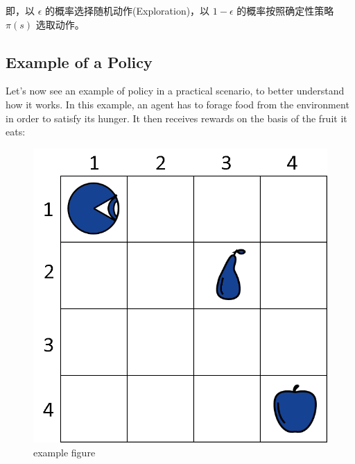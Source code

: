 即，以 $\epsilon$ 的概率选择随机动作(Exploration)，以 $1 - \epsilon$ 
的概率按照确定性策略 $\pi(s)$ 选取动作。


\subsection{Example of a Policy}

Let's now see an example of policy in a practical scenario, 
to better understand how it works. In this example, an agent 
has to forage food from the environment in order to satisfy 
its hunger. It then receives rewards on the basis of the 
fruit it eats:

\begin{figure}[H]

\centering
\includegraphics[scale=0.5]{pix/example1.png}
\caption{example figure}
\end{figure}

